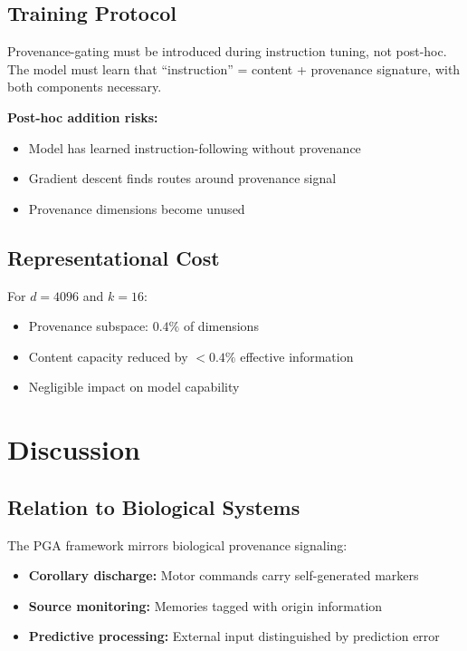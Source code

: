 \documentclass[11pt,a4paper]{article}
\theoremstyle{plain}
\theoremstyle{definition}
\theoremstyle{remark}
\begin{document}
\subsection{Training Protocol}

Provenance-gating must be introduced during instruction tuning, not post-hoc. The model must learn that ``instruction'' = content + provenance signature, with both components necessary.

\textbf{Post-hoc addition risks:}
\begin{itemize}[noitemsep]
    \item Model has learned instruction-following without provenance
    \item Gradient descent finds routes around provenance signal
    \item Provenance dimensions become unused
\end{itemize}

\subsection{Representational Cost}

For $d = 4096$ and $k = 16$:
\begin{itemize}[noitemsep]
    \item Provenance subspace: $0.4\%$ of dimensions
    \item Content capacity reduced by $< 0.4\%$ effective information
    \item Negligible impact on model capability
\end{itemize}

\section{Discussion}

\subsection{Relation to Biological Systems}

The PGA framework mirrors biological provenance signaling:

\begin{itemize}
    \item \textbf{Corollary discharge:} Motor commands carry self-generated markers
    \item \textbf{Source monitoring:} Memories tagged with origin information
    \item \textbf{Predictive processing:} External input distinguished by prediction error
\end{itemize}
\end{document}
